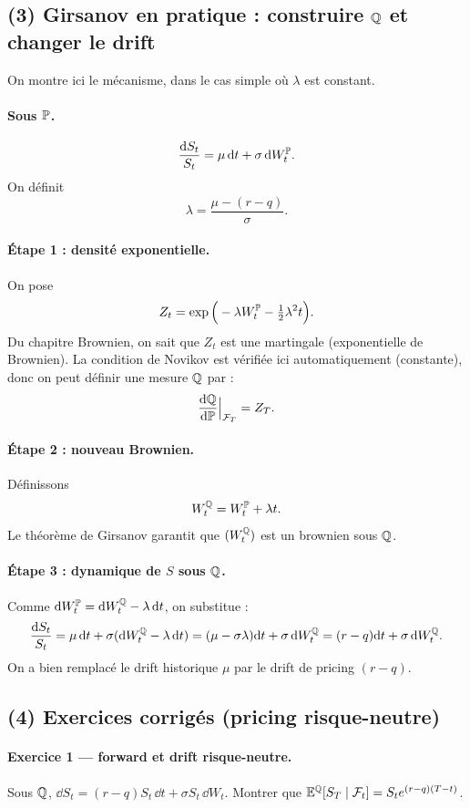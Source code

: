 \subsection*{(3) Girsanov en pratique : construire $\mathbb{Q}$ et changer le drift}
On montre ici le mécanisme, dans le cas simple où $\lambda$ est constant.

\paragraph{Sous $\mathbb{P}$.}
\[
\frac{\mathrm{d} S_t}{S_t}=\mu\,\mathrm{d} t+\sigma\,\mathrm{d} W_t^{\mathbb{P}}.
\]
On définit
\[
\lambda=\frac{\mu-(r-q)}{\sigma}.
\]

\paragraph{Étape 1 : densité exponentielle.}
On pose
\[
Z_t=\exp\Big(-\lambda W_t^{\mathbb{P}}-\tfrac12\lambda^2 t\Big).
\]
Du chapitre Brownien, on sait que $Z_t$ est une martingale (exponentielle de Brownien).
La condition de Novikov est vérifiée ici automatiquement (constante), donc on peut définir une mesure $\mathbb{Q}$ par :
\[
\frac{\mathrm{d} \mathbb{Q}}{\mathrm{d} \mathbb{P}}\Big|_{\mathcal{F}_T}=Z_T.
\]

\paragraph{Étape 2 : nouveau Brownien.}
Définissons
\[
W_t^{\mathbb{Q}}=W_t^{\mathbb{P}}+\lambda t.
\]
Le théorème de Girsanov garantit que $(W_t^{\mathbb{Q}})$ est un brownien sous $\mathbb{Q}$.

\paragraph{Étape 3 : dynamique de $S$ sous $\mathbb{Q}$.}
Comme $\mathrm{d} W_t^{\mathbb{P}}=\mathrm{d} W_t^{\mathbb{Q}}-\lambda\,\mathrm{d} t$, on substitue :
\[
\frac{\mathrm{d} S_t}{S_t}
=\mu\,\mathrm{d} t+\sigma(\mathrm{d} W_t^{\mathbb{Q}}-\lambda\,\mathrm{d} t)
=(\mu-\sigma\lambda)\mathrm{d} t+\sigma\,\mathrm{d} W_t^{\mathbb{Q}}
=(r-q)\mathrm{d} t+\sigma\,\mathrm{d} W_t^{\mathbb{Q}}.
\]
On a bien remplacé le drift historique $\mu$ par le drift de pricing $(r-q)$.

\subsection*{(4) Exercices corrigés (pricing risque-neutre)}
\paragraph{Exercice 1 --- forward et drift risque-neutre.}
Sous $\mathbb{Q}$, $\dd S_t=(r-q)S_t\,\dd t+\sigma S_t\,\dd W_t$.
Montrer que $\mathbb{E}^{\mathbb{Q}}[S_T\mid \mathcal{F}_t]=S_t e^{(r-q)(T-t)}$.

